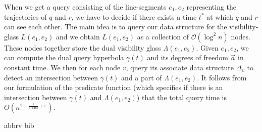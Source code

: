 \documentclass[a4paper, UKenglish]{lipics-v2018}
\begin{document}
 When we get a query consisting of the line-segments $e_1, e_2$
representing the trajectories of $q$ and $r$, we have to decide if there exists
a time $t^*$ at which $q$ and $r$ can see each other. The main idea is to query
our data structure for the visibility-glass $L(e_1, e_2)$ and we obtain $L(e_1, e_2)$ as a collection of $\mathcal{O}(\log^2 n)$ nodes. These nodes together store the dual visibility glass $\Lambda(e_1, e_2)$. Given $e_1, e_2$, we can compute the dual query hyperbola $\gamma(t)$ and its degrees of freedom $\vec{a}$ in constant time. We then for each node $v$, query its associate data structure $\Delta_v$ to detect an intersection between $\gamma(t)$ and a part of $\Lambda(e_1, e_2)$. It follows from our formulation of the predicate function (which specifies if there is an intersection between $\gamma(t)$ and $\Lambda(e_1, e_2)$) that the total query time is $O(n^{1 - \frac{1}{16000} + \varepsilon})$.
%

 {abbrv}
 {bib}

\appendix
\end{document}
